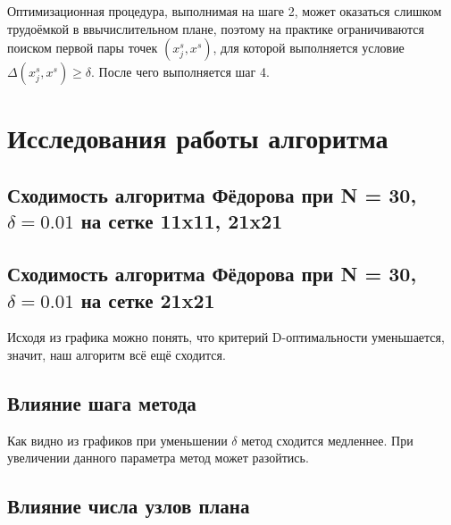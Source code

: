 Оптимизационная процедура, выполнимая на шаге 2, может оказаться слишком трудоёмкой 
в ввычислительном плане, поэтому на практике ограничиваются поиском первой пары точек
$ \left( x_j^s, x^s \right) $, для которой выполняется условие 
$ \Delta \left( x_j^s, x^s \right) \geq \delta $. После чего выполняется шаг 4.


\section{Исследования работы алгоритма}


\subsection{Сходимость алгоритма Фёдорова при N = 30, $\delta = 0.01$ на сетке 11x11, 21x21}
\vspace{30mm}


\subsection{Сходимость алгоритма Фёдорова при N = 30, $\delta = 0.01$ на сетке 21x21}



Исходя из графика можно понять, что критерий D-оптимальности уменьшается, значит, наш алгоритм всё ещё сходится.
\vspace{30mm}


\subsection{Влияние шага метода}

Как видно из графиков при уменьшении $\delta$ метод сходится медленнее.
При увеличении данного параметра метод может разойтись.


\subsection{Влияние числа узлов плана}

